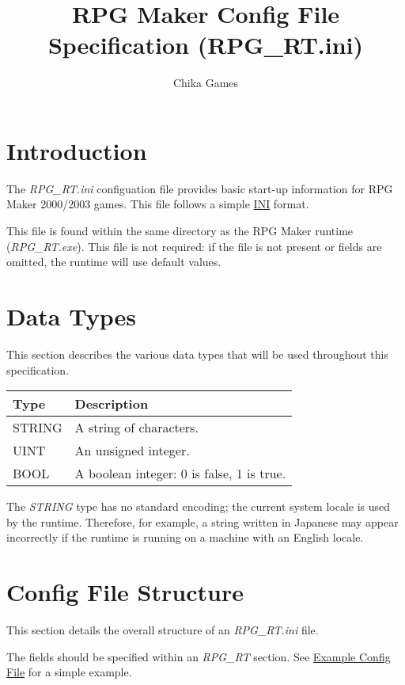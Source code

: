 

\title{RPG Maker Config File Specification (RPG\_RT.ini)}
\author{Chika Games}


\specpreamble

\section{Introduction}
The \textit{RPG\_RT.ini} configuation file provides basic start-up information for RPG Maker 2000/2003 games. This file follows a simple \href{https://en.wikipedia.org/wiki/INI_file}{INI} format.

This file is found within the same directory as the RPG Maker runtime (\textit{RPG\_RT.exe}). This file is not required: if the file is not present or fields are omitted, the runtime will use default values.

\section{Data Types}
This section describes the various data types that will be used throughout this specification.

\begin{table}[h!]
\centering
\begin{tabular}{|l|l|}
\hline
\textbf{Type} & \textbf{Description}                      \\ \hline
STRING        & A string of characters.                   \\ \hline
UINT          & An unsigned integer.                      \\ \hline
BOOL          & A boolean integer: 0 is false, 1 is true. \\ \hline
\end{tabular}
\end{table}

The \textit{STRING} type has no standard encoding; the current system locale is used by the runtime. Therefore, for example, a string written in Japanese may appear incorrectly if the runtime is running on a machine with an English locale.

\section{Config File Structure}
This section details the overall structure of an \textit{RPG\_RT.ini} file.

The fields should be specified within an \textit{RPG\_RT} section. See \hyperref[sec:example]{Example Config File} for a simple example.

